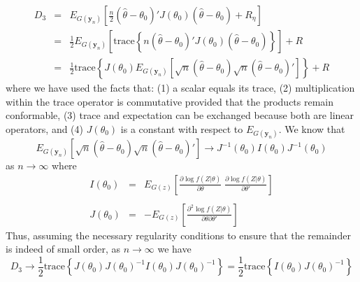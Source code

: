 \documentclass[12pt]{article}
\theoremstyle{definition}
\begin{document}
	\begin{eqnarray*}
		D_3 &=& E_{G(\mathbf{y}_n)}\left[  \frac{n}{2} \left( \hat{\theta}- \theta_0\right)'J(\theta_0)\left(\hat{\theta}- \theta_0\right) + R_\eta  \right]\\
		&=& \frac{1}{2} E_{G(\mathbf{y}_n)}\left[ \mbox{trace}\left\{n\left( \hat{\theta}- \theta_0\right)'J(\theta_0)\left(\hat{\theta}- \theta_0\right) \right\} \right] + R\\
			&=& \frac{1}{2}\mbox{trace}\left\{J(\theta_0) E_{G(\mathbf{y}_n)}\left[\sqrt{n} \left( \hat{\theta}- \theta_0\right)\sqrt{n}\left(\hat{\theta}- \theta_0\right)' \right]\right\} + R
	\end{eqnarray*}
where we have used the facts that: (1) a scalar equals its trace, (2) multiplication within the trace operator is commutative provided that the products remain conformable, (3) trace and expectation can be exchanged because both are linear operators, and (4) $J(\theta_0)$ is a constant with respect to $E_{G(\mathbf{y}_n)}$. We know that
	$$E_{G(\mathbf{y}_n)}\left[\sqrt{n} \left( \hat{\theta}- \theta_0\right)\sqrt{n}\left(\hat{\theta}- \theta_0\right)' \right]\rightarrow J^{-1}(\theta_0) I(\theta_0)J^{-1}(\theta_0)$$
as $n\rightarrow \infty$ where
	\begin{eqnarray*}
	I(\theta_0) &=&E_{G(z)}\left[ \frac{\partial \log{f(Z|\theta)}}{\partial \theta} \;\frac{\partial \log{f(Z|\theta)}}{\partial \theta'} \right]\\\\
	J(\theta_0) &=& - E_{G(z)}\left[ \frac{\partial^2  \log{f(Z|\theta)}}{\partial \theta \partial \theta'}\right]
	\end{eqnarray*}
Thus, assuming the necessary regularity conditions to ensure that the remainder is indeed of small order, as $n\rightarrow \infty$ we have
	$$D_3 \rightarrow \frac{1}{2} \mbox{trace}\left\{ J(\theta_0) J(\theta_0)^{-1}I(\theta_0)J(\theta_0)^{-1}  \right\} = \frac{1}{2}\mbox{trace}\left\{ I(\theta_0)J(\theta_0)^{-1} \right\}$$
\end{document}
